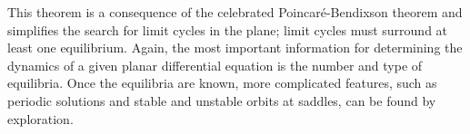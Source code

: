 \documentclass{ximera}
\begin{document}
This theorem is a consequence of the celebrated Poincar\'e-Bendixson theorem
 and simplifies the search for limit 
cycles in the plane; limit cycles must surround at least one equilibrium.  
Again, the most important information for determining the dynamics of a given 
planar differential equation is the number and type of equilibria.  Once the 
equilibria are known, more complicated features, such as periodic 
solutions and stable and unstable orbits at saddles, can be found by 
exploration.

\EXER

\end{document}
